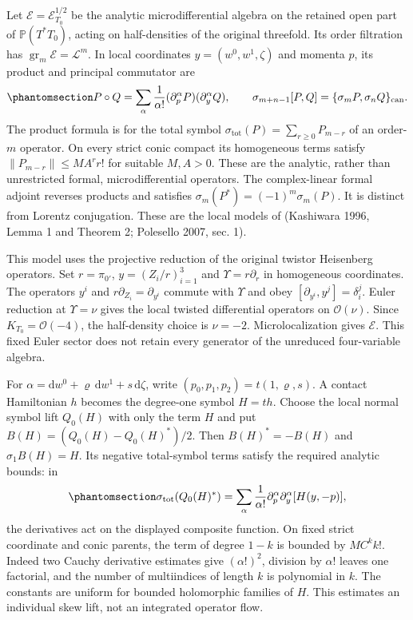 \documentclass[
  english,
  11pt,
  reqno]{amsart}
\begin{document}
Let \(\mathcal E=\mathcal E_{T_0}^{1/2}\) be the analytic
microdifferential algebra on the retained open part of
\(\mathbb P(T^*T_0)\), acting on half-densities of the original
threefold. Its order filtration has
\(\operatorname{gr}_m\mathcal E=\mathcal L^m\). In local coordinates
\(y=(w^0,w^1,\zeta)\) and momenta \(p\), its product and principal
commutator are
\begin{equation}\protect\phantomsection\label{eq:gg-op-symbol-product}{
 P\circ Q=\sum_\alpha\frac1{\alpha!}
                  (\partial_p^\alpha P)(\partial_y^\alpha Q),
 \qquad
 \sigma_{m+n-1}[P,Q]
       =\{\sigma_mP,\sigma_nQ\}_{\mathrm{can}} .
}\end{equation} The product formula is for the total symbol
\(\sigma_{\mathrm{tot}}(P)=\sum_{r\ge0}P_{m-r}\) of an order-\(m\)
operator. On every strict conic compact its homogeneous terms satisfy
\(\|P_{m-r}\|\le MA^rr!\) for suitable \(M,A>0\). These are the
analytic, rather than unrestricted formal, microdifferential operators.
The complex-linear formal adjoint reverses products and satisfies
\(\sigma_m(P^*)=(-1)^m\sigma_m(P)\). It is distinct from Lorentz
conjugation. These are the local models of (Kashiwara 1996, Lemma 1 and
Theorem 2; Polesello 2007, sec. 1).

This model uses the projective reduction of the original twistor
Heisenberg operators. Set \(r=\pi_{0'}\), \(y=(Z_i/r)_{i=1}^3\) and
\(\Upsilon=r\partial_r\) in homogeneous coordinates. The operators
\(y^i\) and \(r\partial_{Z_i}=\partial_{y^i}\) commute with \(\Upsilon\)
and obey \([\partial_{y^i},y^j]=\delta_i^j\). Euler reduction at
\(\Upsilon=\nu\) gives the local twisted differential operators on
\(\mathcal O(\nu)\). Since \(K_{T_0}=\mathcal O(-4)\), the half-density
choice is \(\nu=-2\). Microlocalization gives \(\mathcal E\). This fixed
Euler sector does not retain every generator of the unreduced
four-variable algebra.

For \(\alpha=\mathrm dw^0+\varrho\,\mathrm dw^1+s\,\mathrm d\zeta\),
write \((p_0,p_1,p_2)=t(1,\varrho,s)\). A contact Hamiltonian \(h\)
becomes the degree-one symbol \(H=th\). Choose the local normal symbol
lift \(Q_0(H)\) with only the term \(H\) and put
\(B(H)=(Q_0(H)-Q_0(H)^*)/2\). Then \(B(H)^*=-B(H)\) and
\(\sigma_1 B(H)=H\). Its negative total-symbol terms satisfy the
required analytic bounds: in
\begin{equation}\protect\phantomsection\label{eq:gg-op-adjoint-bound}{
 \sigma_{\mathrm{tot}}(Q_0(H)^*)
   =\sum_\alpha\frac1{\alpha!}
       \partial_p^\alpha\partial_y^\alpha[H(y,-p)],
}\end{equation} the derivatives act on the displayed composite function.
On fixed strict coordinate and conic parents, the term of degree \(1-k\)
is bounded by \(M C^k k!\). Indeed two Cauchy derivative estimates give
\((\alpha!)^2\), division by \(\alpha!\) leaves one factorial, and the
number of multiindices of length \(k\) is polynomial in \(k\). The
constants are uniform for bounded holomorphic families of \(H\). This
estimates an individual skew lift, not an integrated operator flow.
\end{document}

